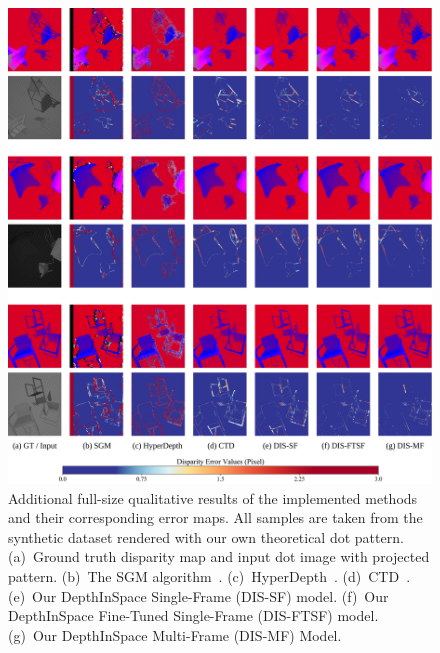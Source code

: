\begin{figure}
    \begin{center}
        \includegraphics[width=1\linewidth]{images/chapter2/supp_figures/supp_results_2.jpg}
    \end{center}
   \caption{Additional full-size qualitative results of the implemented methods and their corresponding error maps. All samples are taken from the synthetic dataset rendered with our own theoretical dot pattern. (a)~Ground truth disparity map and input dot image with projected pattern. (b)~The SGM algorithm~\cite{hirschmuller2007stereo}. (c)~HyperDepth~\cite{ryan2016hyperdepth}. (d)~CTD~\cite{riegler2019connecting}. (e)~Our DepthInSpace Single-Frame (DIS-SF) model. (f)~Our DepthInSpace Fine-Tuned Single-Frame (DIS-FTSF) model. (g)~Our DepthInSpace Multi-Frame (DIS-MF) Model.}
    \label{fig:c2_sim_results}
\end{figure}

